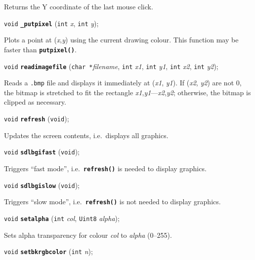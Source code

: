 \documentclass[a4paper,11pt]{article}
\newcommand{\V}{\texttt{void}}      %
\newcommand{\I}{\texttt{int}}       %
\newcommand{\Ue}{\texttt{Uint8}}    %
\newcommand{\C}{\texttt{char *}}    %
\newcommand{\func}[1]{\textbf{\texttt{#1}}}  %
\newcommand{\A}[1]{\emph{#1}}       %
\newcommand{\F}[1]{\texttt{#1}}     %
\newenvironment{bgi}
{ %
  \begin{snugshade}
}
{ %
  \end{snugshade}
}
\begin{document}
Returns the Y coordinate of the last mouse click.


\begin{bgi}
\V{} \func{\_putpixel} (\I{} \A{x}, \I{} \A{y}); 
\end{bgi}

Plots a point at (\A{x},\A{y}) using the current drawing colour. This
function may be faster than \func{putpixel()}.


\begin{bgi}
\V{} \func{readimagefile} (\C{}\A{filename}, \I{} \A{x1}, \I{} \A{y1}, 
\I{} \A{x2}, \I{} \A{y2});
\end{bgi}

Reads a \F{.bmp} file and displays it immediately at (\A{x1}, \A{y1}).
If (\A{x2}, \A{y2}) are not 0, the bitmap is stretched to fit the
rectangle \A{x1},\A{y1}---\A{x2},\A{y2}; otherwise, the bitmap is
clipped as necessary.


\begin{bgi}
\V{} \func{refresh} (\V{}); 
\end{bgi}

Updates the screen contents, i.e.\ displays all graphics.


\begin{bgi}
\V{} \func{sdlbgifast} (\V{}); 
\end{bgi}

Triggers ``fast mode'', i.e.\ \func{refresh()} is needed to display
graphics.


\begin{bgi}
\V{} \func{sdlbgislow} (\V{}); 
\end{bgi}

Triggers ``slow mode'', i.e.\ \func{refresh()} is not needed to
display graphics.


\begin{bgi}
\V{} \func{setalpha} (\I{} \A{col}, \Ue{} \A{alpha}); 
\end{bgi}

Sets alpha transparency for colour \A{col} to \A{alpha} (0--255).


\begin{bgi}
\V{} \func{setbkrgbcolor} (\I{} \A{n}); 
\end{bgi}
\end{document}
